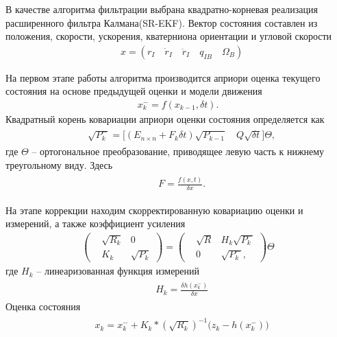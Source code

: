 \documentclass[a4paper,12pt]{article}
\begin{document}
В качестве алгоритма фильтрации выбрана квадратно-корневая реализация расширенного фильтра Калмана(SR-EKF). Вектор состояния составлен из положения, скорости, ускорения, кватерниона ориентации и угловой скорости
\begin{align} 
&x = (r_I \quad \dot{r}_I \quad \ddot{r}_I \quad q_{IB} \quad \Omega_B)
\end{align}

На первом этапе работы алгоритма производится априори оценка текущего состояния на основе предыдущей оценки и модели движения
\begin{align}
x_k^- = f(x_{k-1}, \delta t).
\end{align} 
Квадратный корень ковариации априори оценки состояния определяется как
\begin{align}
\begin{split}
&\sqrt{P^-_k} = \Big[ (E_{n \times n} +  F_k \delta t) \sqrt{P_{k-1}} \quad Q \sqrt{\delta t}  \Big] \Theta,
\end{split}
\end{align}
где $\Theta$ -- ортогональное преобразование, приводящее левую часть к нижнему треугольному виду. Здесь
\begin{align}
\begin{split}
&F = \frac{f(x,t)}{\delta x}.
\end{split}
\end{align}

На этапе коррекции находим скорректированную ковариацию оценки и измерений, а также коэффициент усиления
\begin{align}
\begin{pmatrix}
&\sqrt{R_k} &0 \\
&K_k &\sqrt{P_k}
\end{pmatrix}
=
\begin{pmatrix}
&\sqrt{R} &H_k \sqrt{P_k^-} \\
&0 &\sqrt{P_k^-},
\end{pmatrix} \Theta
\end{align}
где $H_k$ -- линеаризованная функция измерений  
\begin{align}
\begin{split}
&H_k = \frac{\delta h(x_k^-)}{\delta x}
\end{split}
\end{align}
Оценка состояния
\begin{align}
\begin{split}
&x_k = x_k^- + K_k * (\sqrt{R_k})^{-1} \big(z_k - h(x_k^-)\big)
\end{split}
\end{align}
\end{document}
